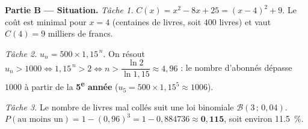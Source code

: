 \smallskip
\noindent\textbf{Partie B — Situation.}
\emph{Tâche 1.} $C(x)=x^2-8x+25=(x-4)^2+9$. Le coût est minimal pour $x=4$ (centaines de
livres, soit $400$ livres) et vaut $C(4)=9$ milliers de francs.

\emph{Tâche 2.} $u_n=500\times1{,}15^{\,n}$. On résout $u_n>1000 \iff 1{,}15^{\,n}>2
\iff n>\dfrac{\ln 2}{\ln 1{,}15}\approx4{,}96$ : le nombre d'abonnés dépasse $1000$ à partir
de la \textbf{5\textsuperscript{e} année} ($u_5=500\times1{,}15^5\approx1006$).

\emph{Tâche 3.} Le nombre de livres mal collés suit une loi binomiale $\mathcal{B}(3\,;\,0{,}04)$.
$P(\text{au moins un})=1-(0{,}96)^3=1-0{,}884736\approx\mathbf{0{,}115}$, soit environ
\SI{11,5}{\percent}.
